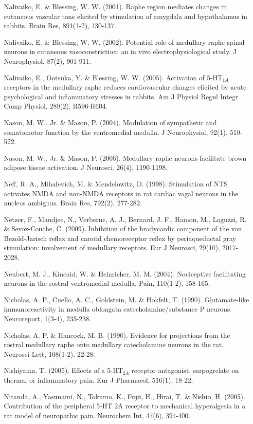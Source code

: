 \documentclass[a4paper,12pt,twoside]{report}
\begin{document}
\begin{singlespacing}
\begin{footnotesize}
Nalivaiko, E. \& Blessing, W. W. (2001). Raphe region mediates changes in cutaneous vascular tone elicited by stimulation of amygdala and hypothalamus in rabbits. Brain Res, 891(1-2), 130-137.

Nalivaiko, E. \& Blessing, W. W. (2002). Potential role of medullary raphe-spinal neurons in cutaneous vasoconstriction: an in vivo electrophysiological study. J Neurophysiol, 87(2), 901-911.

Nalivaiko, E., Ootsuka, Y. \& Blessing, W. W. (2005). Activation of 5-HT$_{1A}$ receptors in the medullary raphe reduces cardiovascular changes elicited by acute psychological and inflammatory stresses in rabbits. Am J Physiol Regul Integr Comp Physiol, 289(2), R596-R604.

Nason, M. W., Jr. \& Mason, P. (2004). Modulation of sympathetic and somatomotor function by the ventromedial medulla. J Neurophysiol, 92(1), 510-522.

Nason, M. W., Jr. \& Mason, P. (2006). Medullary raphe neurons facilitate brown adipose tissue activation. J Neurosci, 26(4), 1190-1198.

Neff, R. A., Mihalevich, M. \& Mendelowitz, D. (1998). Stimulation of NTS activates NMDA and non-NMDA receptors in rat cardiac vagal neurons in the nucleus ambiguus. Brain Res, 792(2), 277-282.

Netzer, F., Mandjee, N., Verberne, A. J., Bernard, J. F., Hamon, M., Laguzzi, R. \& Sevoz-Couche, C. (2009). Inhibition of the bradycardic component of the von Bezold-Jarisch reflex and carotid chemoreceptor reflex by periaqueductal gray stimulation: involvement of medullary receptors. Eur J Neurosci, 29(10), 2017-2028.

Neubert, M. J., Kincaid, W. \& Heinricher, M. M. (2004). Nociceptive facilitating neurons in the rostral ventromedial medulla. Pain, 110(1-2), 158-165.

Nicholas, A. P., Cuello, A. C., Goldstein, M. \& Hokfelt, T. (1990). Glutamate-like immunoreactivity in medulla oblongata catecholamine/substance P neurons. Neuroreport, 1(3-4), 235-238.

Nicholas, A. P. \& Hancock, M. B. (1990). Evidence for projections from the rostral medullary raphe onto medullary catecholamine neurons in the rat. Neurosci Lett, 108(1-2), 22-28.

Nishiyama, T. (2005). Effects of a 5-HT$_{2A}$ receptor antagonist, sarpogrelate on thermal or inflammatory pain. Eur J Pharmacol, 516(1), 18-22.

Nitanda, A., Yasunami, N., Tokumo, K., Fujii, H., Hirai, T. \& Nishio, H. (2005). Contribution of the peripheral 5-HT 2A receptor to mechanical hyperalgesia in a rat model of neuropathic pain. Neurochem Int, 47(6), 394-400.


\end{footnotesize}
\end{singlespacing}
\end{document}
